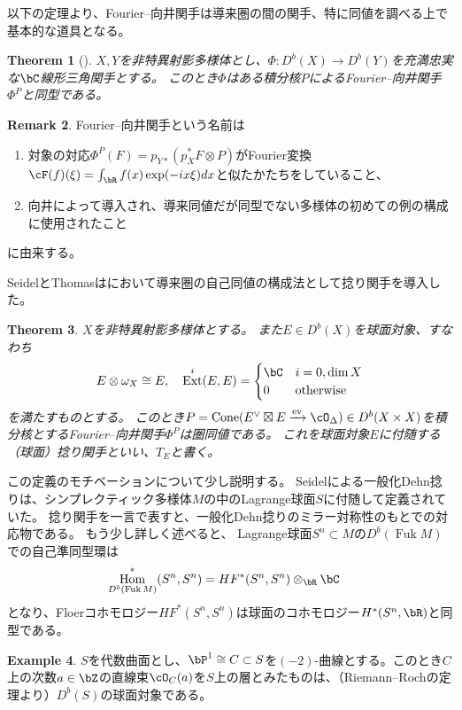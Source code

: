 \documentclass[uplatex,a4paper,dvipdfmx]{jsarticle}
\theoremstyle{plain}
\newtheorem{theorem}{Theorem}[section]
\theoremstyle{definition}
\newtheorem{example}[theorem]{Example}
\newtheorem{remark}[theorem]{Remark}
\DeclareMathOperator{\Hom}{\mathrm{Hom}}
\DeclareMathOperator{\Cone}{\mathrm{Cone}}
\DeclareMathOperator{\ev}{\mathrm{ev}}
\DeclareMathOperator{\Ext}{\mathrm{Ext}}
\DeclareMathOperator{\Fuk}{Fuk}
\begin{document}
以下の定理より、Fourier--向井関手は導来圏の間の関手、特に同値を調べる上で基本的な道具となる。
\begin{theorem}[\cite{MR1465519}]
	$X, Y$を非特異射影多様体とし、$\Phi \colon D^b(X) \to D^b(Y)$を充満忠実な$\bC$線形三角関手とする。
	このとき$\Phi$はある積分核$P$によるFourier--向井関手$\Phi^P$と同型である。
\end{theorem}
\begin{remark}
	Fourier--向井関手という名前は
	\begin{enumerate}
		\item 対象の対応$\Phi^P(F) = p_{Y*}(p_X^*F \otimes P)$がFourier変換$\cF(f)(\xi) = \int_\bR f(x)\exp(-ix\xi)dx$と似たかたちをしていること、
		\item 向井\cite{MR607081}によって導入され、導来同値だが同型でない多様体の初めての例の構成に使用されたこと
	\end{enumerate}
	に由来する。
\end{remark}
SeidelとThomasは\cite{MR1831820}において導来圏の自己同値の構成法として捻り関手を導入した。
\begin{theorem}
	$X$を非特異射影多様体とする。
	また$E \in D^b(X)$を球面対象、すなわち\begin{equation}
		E \otimes \omega_X \cong E,\quad \Ext^i(E, E) = \begin{cases}
			\bC & i = 0, \dim X    \\
			0   & \text{otherwise}
		\end{cases}
	\end{equation}を満たすものとする。
	このとき$P = \Cone(E^\vee \boxtimes E \xrightarrow{\ev} \cO_\Delta) \in D^b(X \times X)$を積分核とするFourier--向井関手$\Phi^P$は圏同値である。
	これを球面対象$E$に付随する（球面）捻り関手といい、$T_E$と書く。
\end{theorem}
この定義のモチベーションについて少し説明する。
Seidelによる一般化Dehn捻りは、シンプレクティック多様体$M$の中のLagrange球面$S$に付随して定義されていた。
捻り関手を一言で表すと、一般化Dehn捻りのミラー対称性のもとでの対応物である。
もう少し詳しく述べると、
Lagrange球面$S^n \subset M$の$D^b(\Fuk M)$での自己準同型環は
\begin{align}
	\Hom_{D^b(\Fuk M)}^*(S^n, S^n) & = HF^*(S^n, S^n)\otimes_\bR \bC
\end{align}
となり、Floerコホモロジー$HF^*(S^n, S^n)$は球面のコホモロジー$H^*(S^n, \bR)$と同型である。

\begin{example}
	$S$を代数曲面とし、$\bP^1 \cong C \subset S$を$(-2)$-曲線とする。このとき$C$上の次数$a \in \bZ$の直線束$\cO_C(a)$を$S$上の層とみたものは、（Riemann--Rochの定理より）$D^b(S)$の球面対象である。
\end{example}
\end{document}
